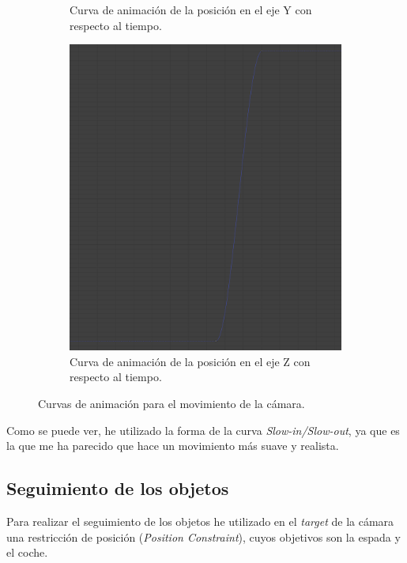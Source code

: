 \begin{figure}[H]
\begin{subfigure}[t]{0.32\textwidth}
        \caption{Curva de animación de la posición en el eje Y con respecto al tiempo.}
    \end{subfigure}
    \hfill
    \begin{subfigure}[t]{0.32\textwidth}
        \centering
        \includegraphics[width=\textwidth]{imagenes/camara/posZ.png}
        \caption{Curva de animación de la posición en el eje Z con respecto al tiempo.}
    \end{subfigure}
    \caption{Curvas de animación para el movimiento de la cámara.}
\end{figure}

Como se puede ver, he utilizado la forma de la curva \textit{Slow-in/Slow-out}, ya que es la que me ha parecido que hace un movimiento más suave y realista.

\subsection{Seguimiento de los objetos}

Para realizar el seguimiento de los objetos he utilizado en el \textit{target} de la cámara una restricción de posición (\textit{Position Constraint}), cuyos objetivos son la espada y el coche.

